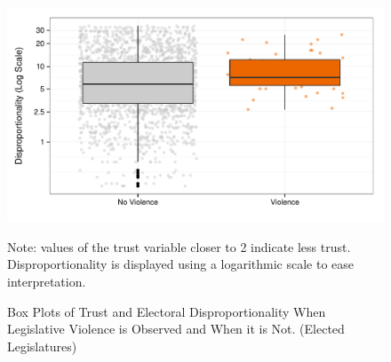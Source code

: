 \documentclass[a4paper]{article}\usepackage{graphicx, color}
\newenvironment{knitrout}{}{} %
\begin{document}
\begin{figure}[t]
    \caption{Box Plots of Trust and Electoral Disproportionality When Legislative Violence is Observed and When it is Not. (Elected Legislatures)}  
    \label{BoxPlot}
    \begin{center}

\begin{knitrout}
\color{fgcolor}
\includegraphics[width=0.8\linewidth]{figure/boxplot} 

\end{knitrout}

    \end{center}
    \begin{singlespace}
        {\scriptsize{Note: values of the trust variable closer to 2 indicate less trust. Disproportionality is displayed using a logarithmic scale to ease interpretation. }}
    \end{singlespace}
\end{figure}
\end{document}

